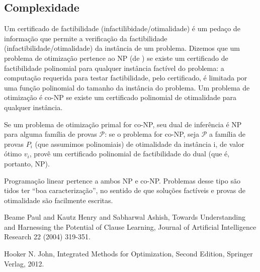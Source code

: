 \documentclass{article}
\begin{document}

\subsection{Complexidade}

Um certificado de factibilidade (infactilibidade/otimalidade) é um pedaço de
informação que permite a verificação da factibilidade (infactibilidade/otimalidade) da instância de
um problema. Dizemos que um problema de otimização pertence ao NP (de ) se existe um certificado de factibilidade polinomial para qualquer instância factível
do problema: a computação requerida para testar factibilidade, pelo certificado, é limitada por uma
função polinomial do tamanho da instância do problema. Um problema de otimização é co-NP se existe
um certificado polinomial de otimalidade para qualquer instância.

Se um problema de otimização primal for co-NP, seu dual de inferência é NP para alguma família de
provas $\mathcal{P}$: se o problema for co-NP, seja $\mathcal{P}$ a família de provas $P_i$ (que
assumimos polinomiais) de otimalidade da instância i, de valor ótimo $v_i$, provê um certificado
polinomial de factibilidade do dual (que é, portanto, NP).

Programação linear pertence a ambos NP e co-NP. Problemas desse tipo são tidos ter ``boa
caracterização'', no sentido de que soluções factíveis e provas de otimalidade são facilmente
escritas.

  \begin{thebibliography}{1}

    Beame Paul and Kautz Henry and Sabharwal Ashish,
    Towards Understanding and Harnessing the Potential of Clause Learning,
    Journal of Artificial Intelligence Research 22 (2004) 319-351.


    Hooker N. John, Integrated Methods for Optimization, Second Edition, Springer Verlag, 2012.

  \end{thebibliography}
\end{document}
